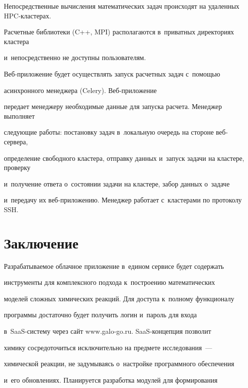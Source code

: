 Непосредственные вычисления математических задач происходят на удаленных HPC-клас\-те\-рах. 


Расчетные библиотеки (C++, MPI) располагаются в~приватных директориях кластера 


и~непосредственно не доступны пользователям.





Веб-при\-ло\-же\-ние будет осуществлять запуск расчетных задач с~по\-мощью 


асинхронного менеджера (Celery). Веб-при\-ло\-же\-ние 


передает менеджеру необходимые данные для запуска расчета. Менеджер выполняет 


следующие работы: постановку задач в~локальную очередь на стороне веб-сер\-ве\-ра, 


определение свободного кластера, отправку данных и~запуск задачи на кластере, проверку 


и~получение ответа о~со\-сто\-янии задачи на кластере, забор данных о~задаче 


и~передачу их веб-при\-ло\-же\-нию. Менеджер работает с~клас\-те\-ра\-ми по протоколу SSH.








  


  \section{Заключение}


    


  Разрабатываемое облачное приложение в~едином сервисе будет содержать 


инструменты для комплексного подхода к~построению математических 


моделей сложных химических реакций. Для доступа к~полному функционалу 


программы достаточно будет получить логин и~пароль для входа  


в~SaaS-сис\-те\-му через сайт {\sf www.galo-go.ru}. SaaS-кон\-цеп\-ция позволит 


химику сосредоточиться исключительно на предмете исследования~--- 


химической реакции, не задумываясь о~настройке программного обеспечения 


и~его обновлениях. Планируется разработка модулей для формирования 


